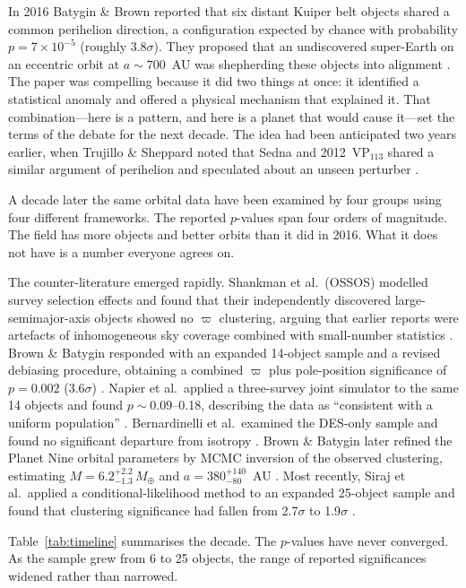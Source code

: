 \documentclass[usenatbib]{mnras}
\begin{document}
In 2016 Batygin \& Brown reported that six distant Kuiper belt objects shared a common perihelion direction, a configuration expected by chance with probability $p=7\times10^{-5}$ (roughly 3.8$\sigma$). They proposed that an undiscovered super-Earth on an eccentric orbit at $a\sim700$~AU was shepherding these objects into alignment \cite{batygin2016}. The paper was compelling because it did two things at once: it identified a statistical anomaly and offered a physical mechanism that explained it. That combination---here is a pattern, and here is a planet that would cause it---set the terms of the debate for the next decade. The idea had been anticipated two years earlier, when Trujillo \& Sheppard noted that Sedna and 2012~VP$_{113}$ shared a similar argument of perihelion and speculated about an unseen perturber \cite{trujillo2014}.

A decade later the same orbital data have been examined by four groups using four different frameworks. The reported $p$-values span four orders of magnitude. The field has more objects and better orbits than it did in 2016. What it does not have is a number everyone agrees on.

The counter-literature emerged rapidly. Shankman et al.\ (OSSOS) modelled survey selection effects and found that their independently discovered large-semimajor-axis objects showed no $\varpi$ clustering, arguing that earlier reports were artefacts of inhomogeneous sky coverage combined with small-number statistics \cite{shankman2017}. Brown \& Batygin responded with an expanded 14-object sample and a revised debiasing procedure, obtaining a combined $\varpi$ plus pole-position significance of $p=0.002$ (3.6$\sigma$) \cite{brown2019}. Napier et al.\ applied a three-survey joint simulator to the same 14 objects and found $p\sim0.09$--0.18, describing the data as ``consistent with a uniform population'' \cite{napier2021}. Bernardinelli et al.\ examined the DES-only sample and found no significant departure from isotropy \cite{bernardinelli2020}. Brown \& Batygin later refined the Planet Nine orbital parameters by MCMC inversion of the observed clustering, estimating $M = 6.2^{+2.2}_{-1.3}\,M_\oplus$ and $a = 380^{+140}_{-80}$~AU \cite{brown2021}. Most recently, Siraj et al.\ applied a conditional-likelihood method to an expanded 25-object sample and found that clustering significance had fallen from 2.7$\sigma$ to 1.9$\sigma$ \cite{siraj2025,siraj2026}.

Table~\ref{tab:timeline} summarises the decade. The $p$-values have never converged. As the sample grew from 6 to 25 objects, the range of reported significances widened rather than narrowed.
\end{document}
